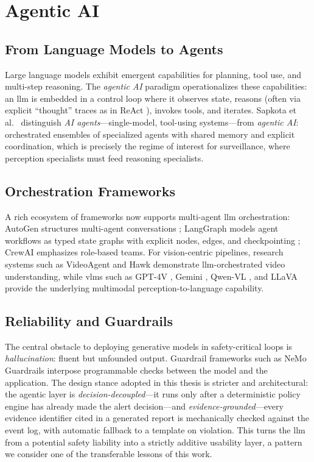 \section{Agentic AI}

\subsection{From Language Models to Agents}

Large language models exhibit emergent capabilities for planning, tool use, and multi-step reasoning. The \emph{agentic AI} paradigm operationalizes these capabilities: an \gls{llm} is embedded in a control loop where it observes state, reasons (often via explicit ``thought'' traces as in ReAct \cite{yao2023react}), invokes tools, and iterates. Sapkota et al.\ \cite{sapkota2025ai} distinguish \emph{AI agents}---single-model, tool-using systems---from \emph{agentic AI}: orchestrated ensembles of specialized agents with shared memory and explicit coordination, which is precisely the regime of interest for surveillance, where perception specialists must feed reasoning specialists.

\subsection{Orchestration Frameworks}

A rich ecosystem of frameworks now supports multi-agent \gls{llm} orchestration: AutoGen structures multi-agent conversations \cite{wu2023autogen}; LangGraph models agent workflows as typed state graphs with explicit nodes, edges, and checkpointing \cite{langgraph2024}; CrewAI emphasizes role-based teams. For vision-centric pipelines, research systems such as VideoAgent \cite{fan2024videoagent} and Hawk \cite{cheng2025hawk} demonstrate \gls{llm}-orchestrated video understanding, while \gls{vlm}s such as GPT-4V \cite{openai2023gpt4}, Gemini \cite{google2023gemini}, Qwen-VL \cite{alibaba2023qwenvl}, and LLaVA \cite{liu2023visual} provide the underlying multimodal perception-to-language capability.

\subsection{Reliability and Guardrails}

The central obstacle to deploying generative models in safety-critical loops is \emph{hallucination}: fluent but unfounded output. Guardrail frameworks such as NeMo Guardrails \cite{rebedea2023nemo} interpose programmable checks between the model and the application. The design stance adopted in this thesis is stricter and architectural: the agentic layer is \emph{decision-decoupled}---it runs only after a deterministic policy engine has already made the alert decision---and \emph{evidence-grounded}---every evidence identifier cited in a generated report is mechanically checked against the event log, with automatic fallback to a template on violation. This turns the \gls{llm} from a potential safety liability into a strictly additive usability layer, a pattern we consider one of the transferable lessons of this work.

